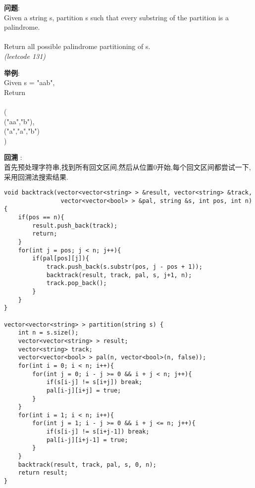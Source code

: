     
\begin{description}
    \item{\textbf{问题}}:\\
Given a string s, partition s such that every substring of the partition is a palindrome.\\
\\
Return all possible palindrome partitioning of s.\\
\textit{(leetcode 131)}
    \item{\textbf{举例}}:\\
Given s = "aab",\\
Return\\
\\
  (\\
    ("aa","b"),\\
    ("a","a","b")\\
  )
    \item{\textbf{回溯}} : 
    \\首先预处理字符串,找到所有回文区间,然后从位置0开始,每个回文区间都尝试一下,采用回溯法搜索结果.
    \begin{lstlisting}
void backtrack(vector<vector<string> > &result, vector<string> &track,
				vector<vector<bool> > &pal, string &s, int pos, int n){
	if(pos == n){
		result.push_back(track);
		return;
	}
	for(int j = pos; j < n; j++){
		if(pal[pos][j]){
			track.push_back(s.substr(pos, j - pos + 1));
			backtrack(result, track, pal, s, j+1, n);
			track.pop_back();
		}
	}
}

vector<vector<string> > partition(string s) {
	int n = s.size();
	vector<vector<string> > result;
	vector<string> track;
	vector<vector<bool> > pal(n, vector<bool>(n, false));
	for(int i = 0; i < n; i++){
		for(int j = 0; i - j >= 0 && i + j < n; j++){
			if(s[i-j] != s[i+j]) break;
			pal[i-j][i+j] = true;
		}
	}
	for(int i = 1; i < n; i++){
		for(int j = 1; i - j >= 0 && i + j <= n; j++){
			if(s[i-j] != s[i+j-1]) break;
			pal[i-j][i+j-1] = true;
		}
	}
	backtrack(result, track, pal, s, 0, n);
	return result;
}
    \end{lstlisting}
\end{description}
